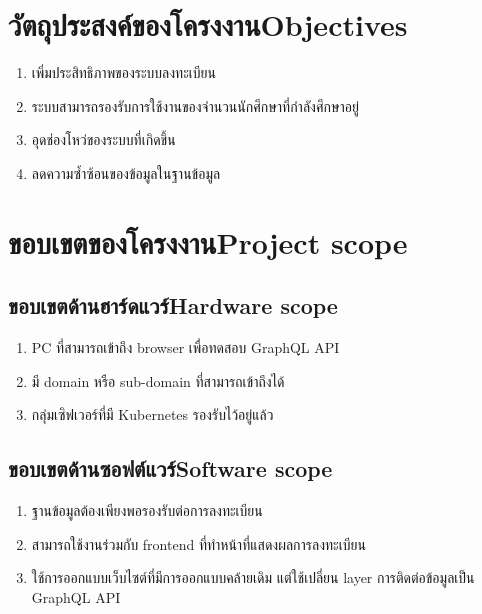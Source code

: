 \section{\ifcpe วัตถุประสงค์ของโครงงาน\else Objectives\fi}
\begin{enumerate}
    \item เพิ่มประสิทธิภาพของระบบลงทะเบียน
    \item ระบบสามารถรองรับการใช้งานของจำนวนนักศึกษาที่กำลังศึกษาอยู่
    \item อุดช่องโหว่ของระบบที่เกิดขึ้น
    \item ลดความซ้ำซ้อนของข้อมูลในฐานข้อมูล
\end{enumerate}

\section{\ifcpe ขอบเขตของโครงงาน\else Project scope\fi}

\subsection{\ifcpe ขอบเขตด้านฮาร์ดแวร์\else Hardware scope\fi}
\begin{enumerate}
    \item PC ที่สามารถเข้าถึง browser เพื่อทดสอบ GraphQL API
    \item มี domain หรือ sub-domain ที่สามารถเข้าถึงได้
    \item กลุ่มเซิฟเวอร์ที่มี Kubernetes รองรับไว้อยู่แล้ว
\end{enumerate}
\subsection{\ifcpe ขอบเขตด้านซอฟต์แวร์\else Software scope\fi}
\begin{enumerate}
    \item ฐานข้อมูลต้องเพียงพอรองรับต่อการลงทะเบียน
    \item สามารถใช้งานร่วมกับ frontend ที่ทำหน้าที่แสดงผลการลงทะเบียน
    \item ใช้การออกแบบเว็บไซต์ที่มีการออกแบบคล้ายเดิม แต่ใช้เปลี่ยน layer การติดต่อข้อมูลเป็น GraphQL API \cite{graphql}
\end{enumerate}
